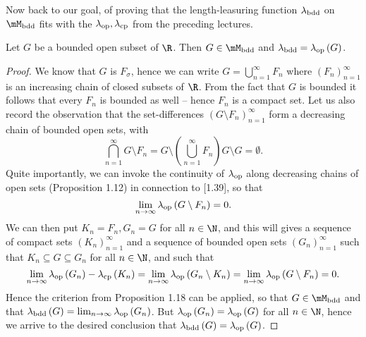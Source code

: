\documentclass[pmath450]{subfiles}
\begin{document}
    \np Now back to our goal, of proving that the length-leasuring function $\lambda_{\operatorname{bdd}}$ on $\mM_{\bdd}$ fits with the $\lambda_{\operatorname{op}},\lambda_{\operatorname{cp}}$ from the preceding lectures.

    \begin{prop}{}
        Let $G$ be a bounded open subset of $\R$. Then $G\in\mM_{\bdd}$ and $\lambda_{\operatorname{bdd}}=\lambda_{\operatorname{op}}\left( G \right)$.
    \end{prop}

    \begin{proof}
        We know that $G$ is $F_{\sigma}$, hence we can write $G=\bigcup^{\infty}_{n=1}F_n$ where $\left( F_{n} \right)^{\infty}_{n=1}$ is an increasing chain of closed subsets of $\R$. From the fact that $G$ is bounded it follows that every $F_n$ is bounded as well -- hence $F_n$ is a compact set. Let us also record the observation that the set-differences $\left( G\setminus F_{n} \right)^{\infty}_{n=1}$ form a decreasing chain of bounded open sets, with
        \begin{equation}
            \bigcap^{\infty}_{n=1}G\setminus F_n = G\setminus \left( \bigcup^{\infty}_{n=1}F_n \right)G\setminus G=\emptyset.
        \end{equation}
        Quite importantly, we can invoke the continuity of $\lambda_{\operatorname{op}}$ along decreasing chains of open sets (Proposition 1.12) in connection to [1.39], so that
        \begin{equation}
            \lim_{n\to\infty}\lambda_{\operatorname{op}}\left( G\setminus F_n \right)=0.
        \end{equation}
        We can then put $K_n=F_n, G_n=G$ for all $n\in\N$, and this will gives a sequence of compact sets $\left( K_{n} \right)^{\infty}_{n=1}$ and a sequence of bounded open sets $\left( G_{n} \right)^{\infty}_{n=1}$ such that $K_n\subseteq G\subseteq G_n$ for all $n\in\N$, and such that
        \begin{equation*}
            \lim_{n\to\infty}\lambda_{\operatorname{op}}\left( G_n \right)-\lambda_{\operatorname{cp}}\left( K_n \right) = \lim_{n\to\infty}\lambda_{\operatorname{op}}\left( G_n\setminus K_n \right) = \lim_{n\to\infty}\lambda_{\operatorname{op}}\left( G\setminus F_n \right)=0.
        \end{equation*}
        Hence the criterion from Proposition 1.18 can be applied, so that $G\in\mM_{\bdd}$ and that $\lambda_{\operatorname{bdd}}\left( G \right)=\lim_{n\to\infty}\lambda_{\operatorname{op}}\left( G_n \right)$. But $\lambda_{\operatorname{op}}\left( G_n \right)=\lambda_{\operatorname{op}}\left( G \right)$ for all $n\in\N$, hence we arrive to the desired conclusion that $\lambda_{\operatorname{bdd}}\left( G \right)=\lambda_{\operatorname{op}}\left( G \right)$.
    \end{proof}
\end{document}
